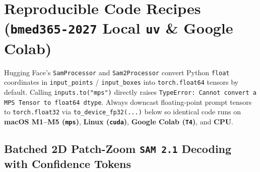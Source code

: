 \documentclass[10.5pt,a4paper]{article}
\begin{document}
\section{Reproducible Code Recipes (\texttt{bmed365-2027} Local \texttt{uv} \& Google Colab)}

\begin{warningbox}
Hugging Face's \texttt{SamProcessor} and \texttt{Sam2Processor} convert Python \texttt{float} coordinates in \texttt{input\_points} / \texttt{input\_boxes} into \texttt{torch.float64} tensors by default. Calling \texttt{inputs.to("mps")} directly raises \texttt{TypeError: Cannot convert a MPS Tensor to float64 dtype}. Always downcast floating-point prompt tensors to \texttt{torch.float32} via \texttt{to\_device\_fp32(...)} below so identical code runs on \textbf{macOS M1--M5 (\texttt{mps})}, \textbf{Linux (\texttt{cuda})}, \textbf{Google Colab (\texttt{T4})}, and \textbf{CPU}.
\end{warningbox}

\subsection{Batched 2D Patch-Zoom \texttt{SAM 2.1} Decoding with Confidence Tokens}
\end{document}
